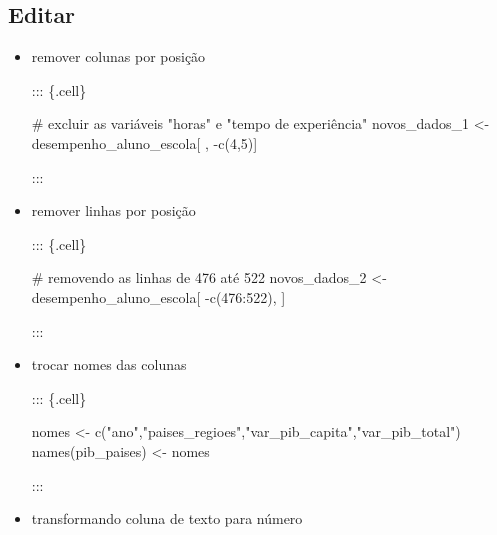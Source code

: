 \documentclass[
  letterpaper,
  DIV=11,
  numbers=noendperiod]{scrreprt}
\newenvironment{Shaded}{\begin{snugshade}}{\end{snugshade}}
\newcommand{\CommentTok}[1]{\textcolor[rgb]{0.37,0.37,0.37}{#1}}
\newcommand{\DecValTok}[1]{\textcolor[rgb]{0.68,0.00,0.00}{#1}}
\newcommand{\FunctionTok}[1]{\textcolor[rgb]{0.28,0.35,0.67}{#1}}
\newcommand{\NormalTok}[1]{\textcolor[rgb]{0.00,0.23,0.31}{#1}}
\newcommand{\OtherTok}[1]{\textcolor[rgb]{0.00,0.23,0.31}{#1}}
\newcommand{\SpecialCharTok}[1]{\textcolor[rgb]{0.37,0.37,0.37}{#1}}
\newcommand{\StringTok}[1]{\textcolor[rgb]{0.13,0.47,0.30}{#1}}
\begin{document}
\hypertarget{editar}{%
\subsection{Editar}\label{editar}}

\begin{itemize}
\item
  remover colunas por posição

  ::: \{.cell\}

\begin{Shaded}
\begin{Highlighting}[]
\CommentTok{\# excluir as variáveis "horas" e "tempo de experiência"}
\NormalTok{novos\_dados\_1 }\OtherTok{\textless{}{-}}\NormalTok{ desempenho\_aluno\_escola[ , }\SpecialCharTok{{-}}\FunctionTok{c}\NormalTok{(}\DecValTok{4}\NormalTok{,}\DecValTok{5}\NormalTok{)]}
\end{Highlighting}
\end{Shaded}

  :::
\item
  remover linhas por posição

  ::: \{.cell\}

\begin{Shaded}
\begin{Highlighting}[]
\CommentTok{\# removendo as linhas de 476 até 522}
\NormalTok{novos\_dados\_2 }\OtherTok{\textless{}{-}}\NormalTok{ desempenho\_aluno\_escola[ }\SpecialCharTok{{-}}\FunctionTok{c}\NormalTok{(}\DecValTok{476}\SpecialCharTok{:}\DecValTok{522}\NormalTok{), ]}
\end{Highlighting}
\end{Shaded}

  :::
\item
  trocar nomes das colunas

  ::: \{.cell\}

\begin{Shaded}
\begin{Highlighting}[]
\NormalTok{nomes }\OtherTok{\textless{}{-}} \FunctionTok{c}\NormalTok{(}\StringTok{"ano"}\NormalTok{,}\StringTok{"paises\_regioes"}\NormalTok{,}\StringTok{"var\_pib\_capita"}\NormalTok{,}\StringTok{"var\_pib\_total"}\NormalTok{)}
\FunctionTok{names}\NormalTok{(pib\_paises) }\OtherTok{\textless{}{-}}\NormalTok{ nomes}
\end{Highlighting}
\end{Shaded}

  :::
\item
  transformando coluna de texto para número


\end{itemize}
\end{document}
